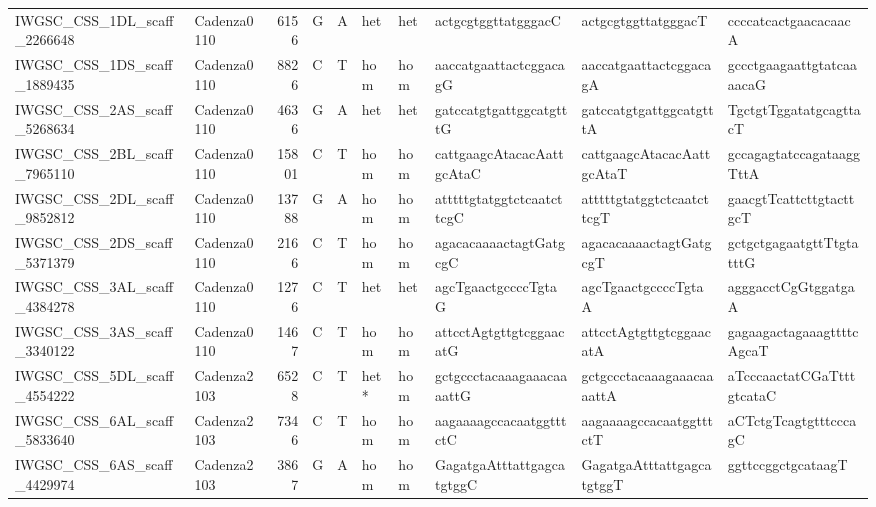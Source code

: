 \begin{tabular}{llrlllllll}
 IWGSC\_CSS\_1DL\_scaff\_2266648  & Cadenza0110 &       6156 & G         & A        & het            & het         & actgcgtggttatgggacC       & actgcgtggttatgggacT       & ccccatcactgaacacaacA      \\
 IWGSC\_CSS\_1DS\_scaff\_1889435  & Cadenza0110 &       8826 & C         & T        & hom            & hom         & aaccatgaattactcggacagG    & aaccatgaattactcggacagA    & gccctgaagaattgtatcaaaacaG \\
 IWGSC\_CSS\_2AS\_scaff\_5268634  & Cadenza0110 &       4636 & G         & A        & het            & het         & gatccatgtgattggcatgtttG   & gatccatgtgattggcatgtttA   & TgctgtTggatatgcagttacT    \\
 IWGSC\_CSS\_2BL\_scaff\_7965110  & Cadenza0110 &      15801 & C         & T        & hom            & hom         & cattgaagcAtacacAattgcAtaC & cattgaagcAtacacAattgcAtaT & gccagagtatccagataaggTttA  \\
 IWGSC\_CSS\_2DL\_scaff\_9852812  & Cadenza0110 &      13788 & G         & A        & hom            & hom         & atttttgtatggtctcaatcttcgC & atttttgtatggtctcaatcttcgT & gaacgtTcattcttgtacttgcT   \\
 IWGSC\_CSS\_2DS\_scaff\_5371379  & Cadenza0110 &       2166 & C         & T        & hom            & hom         & agacacaaaactagtGatgcgC    & agacacaaaactagtGatgcgT    & gctgctgagaatgttTtgtatttG  \\
 IWGSC\_CSS\_3AL\_scaff\_4384278  & Cadenza0110 &       1276 & C         & T        & het            & het         & agcTgaactgccccTgtaG       & agcTgaactgccccTgtaA       & agggacctCgGtggatgaA       \\
 IWGSC\_CSS\_3AS\_scaff\_3340122  & Cadenza0110 &       1467 & C         & T        & hom            & hom         & attcctAgtgttgtcggaacatG   & attcctAgtgttgtcggaacatA   & gagaagactagaaagttttcAgcaT \\
 IWGSC\_CSS\_5DL\_scaff\_4554222  & Cadenza2103 &       6528 & C         & T        & het*           & hom         & gctgccctacaaagaaacaaaattG & gctgccctacaaagaaacaaaattA & aTcccaactatCGaTtttgtcataC \\
 IWGSC\_CSS\_6AL\_scaff\_5833640  & Cadenza2103 &       7346 & C         & T        & hom            & hom         & aagaaaagccacaatggtttctC   & aagaaaagccacaatggtttctT   & aCTctgTcagtgtttcccagC     \\
 IWGSC\_CSS\_6AS\_scaff\_4429974  & Cadenza2103 &       3867 & G         & A        & hom            & hom         & GagatgaAtttattgagcatgtggC & GagatgaAtttattgagcatgtggT & ggttccggctgcataagT        \\

\end{tabular}

